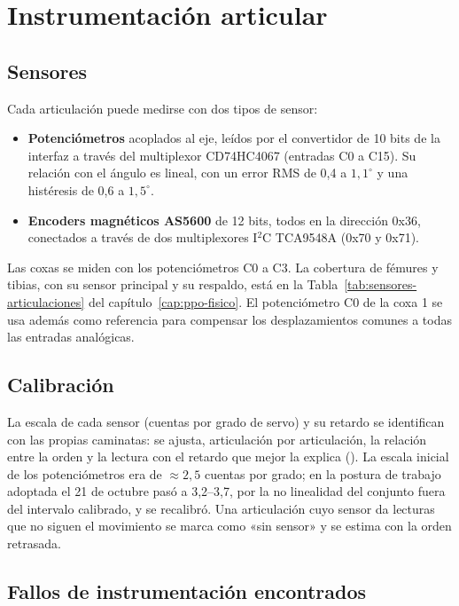 \section{Instrumentación articular}

\subsection{Sensores}

Cada articulación puede medirse con dos tipos de sensor:
\begin{itemize}
    \item \textbf{Potenciómetros} acoplados al eje, leídos por el convertidor de
    10 bits de la interfaz a través del multiplexor CD74HC4067 (entradas C0 a C15). Su
    relación con el ángulo es lineal, con un error RMS de 0,4 a $1{,}1^\circ$ y
    una histéresis de 0,6 a $1{,}5^\circ$.
    \item \textbf{Encoders magnéticos AS5600} de 12 bits, todos en la dirección
    0x36, conectados a través de dos multiplexores I$^2$C TCA9548A (0x70 y 0x71).
\end{itemize}
Las coxas se miden con los potenciómetros C0 a C3. La cobertura de fémures y
tibias, con su sensor principal y su respaldo, está en la
Tabla~\ref{tab:sensores-articulaciones} del capítulo~\ref{cap:ppo-fisico}. El
potenciómetro C0 de la coxa 1 se usa además como referencia para compensar los
desplazamientos comunes a todas las entradas analógicas.

\subsection{Calibración}

La escala de cada sensor (cuentas por grado de servo) y su retardo se
identifican con las propias caminatas: se ajusta, articulación por
articulación, la relación entre la orden y la lectura con el retardo que mejor la
explica (). La escala inicial de los
potenciómetros era de $\approx2{,}5$ cuentas por grado; en la postura de
trabajo adoptada el 21 de octubre pasó a 3,2--3,7, por la no linealidad del
conjunto fuera del intervalo calibrado, y se recalibró. Una articulación cuyo
sensor da lecturas que no siguen el movimiento se marca como «sin sensor» y se
estima con la orden retrasada.

\subsection{Fallos de instrumentación encontrados}

